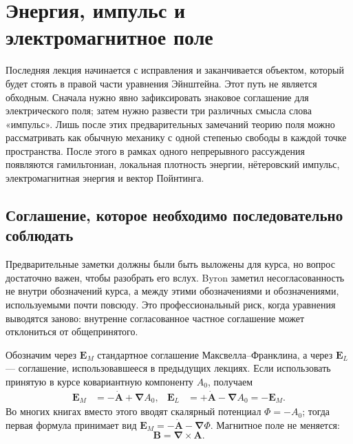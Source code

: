 \chapter{Энергия, импульс и электромагнитное поле}

Последняя лекция начинается с исправления и заканчивается объектом, который будет стоять в правой части уравнения Эйнштейна. Этот путь не является обходным. Сначала нужно явно зафиксировать знаковое соглашение для электрического поля; затем нужно развести три различных смысла слова «импульс». Лишь после этих предварительных замечаний теорию поля можно рассматривать как обычную механику с одной степенью свободы в каждой точке пространства. После этого в рамках одного непрерывного рассуждения появляются гамильтониан, локальная плотность энергии, нётеровский импульс, электромагнитная энергия и вектор Пойнтинга.

\section{Соглашение, которое необходимо последовательно соблюдать}

Предварительные заметки должны были быть выложены для курса, но вопрос достаточно важен, чтобы разобрать его вслух. Byron заметил несогласованность не внутри обозначений курса, а между этими обозначениями и обозначениями, используемыми почти повсюду. Это профессиональный риск, когда уравнения выводятся заново: внутренне согласованное частное соглашение может отклониться от общепринятого.

Обозначим через \(\mathbf E_M\) стандартное соглашение Максвелла--Франклина, а через \(\mathbf E_L\) — соглашение, использовавшееся в предыдущих лекциях. Если использовать принятую в курсе ковариантную компоненту \(A_0\), получаем
\begin{align}
\mathbf E_M
  &= -\dot{\mathbf A}+\boldsymbol{\nabla}A_0,
&
\mathbf E_L
  &= +\dot{\mathbf A}-\boldsymbol{\nabla}A_0
   =-\mathbf E_M .
\label{eq:two-electric-conventions}
\end{align}
Во многих книгах вместо этого вводят скалярный потенциал \(\Phi=-A_0\); тогда первая формула принимает вид
\(\mathbf E_M=-\dot{\mathbf A}-\boldsymbol{\nabla}\Phi\).
Магнитное поле не меняется:
\begin{equation}
\mathbf B=\boldsymbol{\nabla}\times\mathbf A.
\label{eq:B-from-A-opening}
\end{equation}

